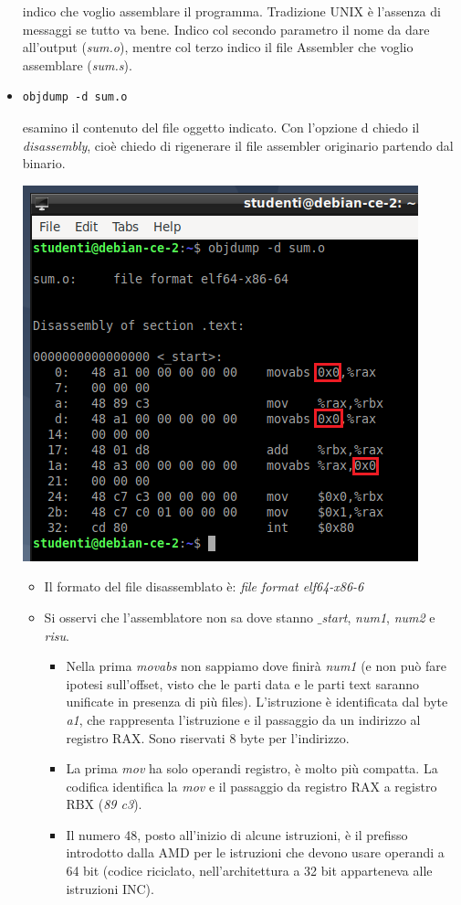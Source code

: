 \documentclass[11pt]{report}
\theoremstyle{definition}
\begin{document}
\begin{itemize}
indico che voglio assemblare il programma. Tradizione UNIX è l'assenza di messaggi se tutto va bene. Indico col secondo parametro il nome da dare all'output (\emph{sum.o}), mentre col terzo indico il file Assembler che voglio assemblare (\emph{sum.s}). 
\item \begin{verbatim}objdump -d sum.o\end{verbatim}
esamino il contenuto del file oggetto indicato. Con l'opzione d chiedo il \emph{disassembly}, cioè chiedo di rigenerare il file assembler originario partendo dal binario. \begin{center}
	\includegraphics{img/140.PNG}
\end{center}
\begin{itemize}
	\item Il formato del file disassemblato è: \emph{file format elf64-x86-6}
	\item Si osservi che l'assemblatore non sa dove stanno \emph{$\_$start}, \emph{num1}, \emph{num2} e \emph{risu}.
	\begin{itemize}
		\item Nella prima \emph{movabs} non sappiamo dove finirà \emph{num1} (e non può fare ipotesi sull'offset, visto che le parti data e le parti text saranno unificate in presenza di più files). L'istruzione è identificata dal byte \emph{a1}, che rappresenta l'istruzione e il passaggio da un indirizzo al registro RAX. Sono riservati 8 byte per l'indirizzo.
		\item La prima \emph{mov} ha solo operandi registro, è molto più compatta. La codifica identifica la \emph{mov} e il passaggio da registro RAX a registro RBX (\emph{89 c3}).
		\item Il numero 48, posto all'inizio di alcune istruzioni, è il prefisso introdotto dalla AMD per le istruzioni che devono usare operandi a 64 bit (codice riciclato, nell'architettura a 32 bit apparteneva alle istruzioni INC).
		

\end{itemize}
\end{itemize}
\end{itemize}
\end{document}
